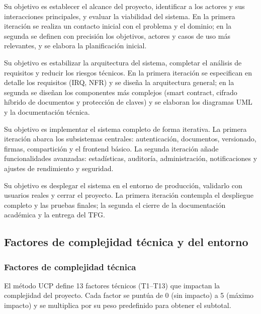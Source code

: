 \documentclass[11pt, a4paper]{article}
\begin{document}
\begin{description}[leftmargin=2cm, style=nextline]
    \item[\textbf{Inicio}] Su objetivo es establecer el alcance del proyecto, identificar a los actores y sus interacciones principales, y evaluar la viabilidad del sistema. En la primera iteración se realiza un contacto inicial con el problema y el dominio; en la segunda se definen con precisión los objetivos, actores y casos de uso más relevantes, y se elabora la planificación inicial.

    \item[\textbf{Elaboración}] Su objetivo es estabilizar la arquitectura del sistema, completar el análisis de requisitos y reducir los riesgos técnicos. En la primera iteración se especifican en detalle los requisitos (IRQ, NFR) y se diseña la arquitectura general; en la segunda se diseñan los componentes más complejos (smart contract, cifrado híbrido de documentos y protección de claves) y se elaboran los diagramas UML y la documentación técnica.

    \item[\textbf{Construcción}] Su objetivo es implementar el sistema completo de forma iterativa. La primera iteración abarca los subsistemas centrales: autenticación, documentos, versionado, firmas, compartición y el frontend básico. La segunda iteración añade funcionalidades avanzadas: estadísticas, auditoría, administración, notificaciones y ajustes de rendimiento y seguridad.

    \item[\textbf{Transición}] Su objetivo es desplegar el sistema en el entorno de producción, validarlo con usuarios reales y cerrar el proyecto. La primera iteración contempla el despliegue completo y las pruebas finales; la segunda el cierre de la documentación académica y la entrega del TFG.
\end{description}

\subsection{Factores de complejidad técnica y del entorno}

\subsubsection{Factores de complejidad técnica}

El método UCP define 13 factores técnicos (T1--T13) que impactan la complejidad del proyecto. Cada factor se puntúa de 0 (sin impacto) a 5 (máximo impacto) y se multiplica por su peso predefinido para obtener el subtotal.
\end{document}
